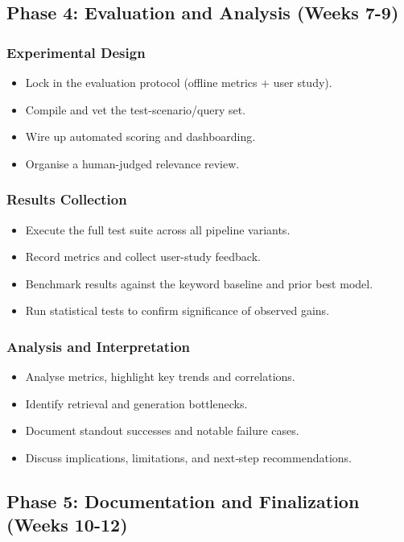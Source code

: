 \documentclass[11pt,a4paper]{article}
\begin{document}
\subsection{Phase 4: Evaluation and Analysis (Weeks 7-9)}
\subsubsection{Experimental Design}
\begin{itemize}[leftmargin=2em]
  \item Lock in the evaluation protocol (offline metrics + user study).
  \item Compile and vet the test-scenario/query set.
  \item Wire up automated scoring and dashboarding.
  \item Organise a human-judged relevance review.
\end{itemize}

\subsubsection{Results Collection}
\begin{itemize}[leftmargin=2em]
  \item Execute the full test suite across all pipeline variants.
  \item Record metrics and collect user-study feedback.
  \item Benchmark results against the keyword baseline and prior best model.
  \item Run statistical tests to confirm significance of observed gains.
\end{itemize}

\subsubsection{Analysis and Interpretation}
\begin{itemize}[leftmargin=2em]
  \item Analyse metrics, highlight key trends and correlations.
  \item Identify retrieval and generation bottlenecks.
  \item Document standout successes and notable failure cases.
  \item Discuss implications, limitations, and next‐step recommendations.
\end{itemize}


\subsection{Phase 5: Documentation and Finalization (Weeks 10-12)}
\end{document}
